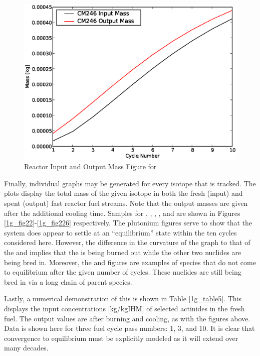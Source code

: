 \begin{figure}[htbp]
\caption{Reactor Input and Output Mass Figure for }
\label{1g_fig26}
\begin{center}
\includegraphics[scale=0.5]{one_group_method/figs/Fig26.eps}
\end{center}
\end{figure}

Finally, individual graphs may be generated for every isotope that is tracked.  
The plots display the total mass of the given isotope in both the fresh (input) and spent (output) 
fast reactor fuel streams.  Note that the output masses are given after the additional cooling time.  
Samples for , , , , and  are shown 
in Figures \ref{1g_fig22}-\ref{1g_fig226} respectively.  The plutonium figures serve to show that the 
system does appear to settle at an ``equilibrium'' state within the ten cycles considered here.  
However, the difference in the curvature of the  graph to that of the  and 
 implies that the  is being burned out while the other two nuclides are 
being bred in.  Moreover, the  and  figures are examples of species that 
do not come to equilibrium after the given number of cycles.  These nuclides are still being bred in 
via a long chain of parent species.  

Lastly, a numerical demonstration of this is shown in Table \ref{1g_table5}.  This displays the 
input concentrations [kg/kgIHM] of selected actinides in the fresh fuel.  The output values are 
after burning and cooling, as with the figures above.  Data is shown here for three fuel cycle 
pass numbers: 1, 3, and 10.  It is clear that convergence to equilibrium must be explicitly 
modeled as it will extend over many decades.

